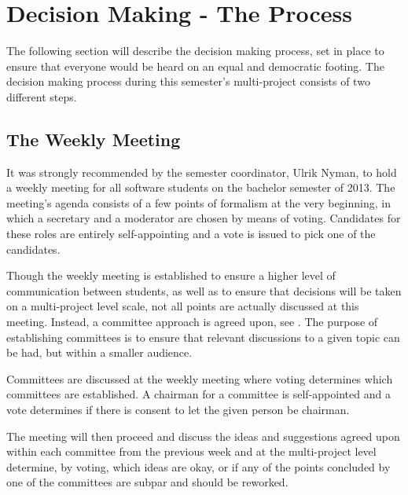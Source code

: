 \section{Decision Making - The Process}
\label{sec:decisionmaking}

The following section will describe the decision making process, set in place to ensure that everyone would be heard on an equal and democratic footing. The decision making process during this semester's multi-project consists of two different steps.

\subsection{The Weekly Meeting}
\label{sub:theweeklymeeting}

It was strongly recommended by the semester coordinator, Ulrik Nyman, to hold a weekly meeting for all software students on the bachelor semester of 2013. The meeting's agenda consists of a few points of formalism at the very beginning, in which a secretary and a moderator are chosen by means of voting. Candidates for these roles are entirely self-appointing and a vote is issued to pick one of the candidates. %

Though the weekly meeting is established to ensure a higher level of communication between students, as well as to ensure that decisions will be taken on a multi-project level scale, not all points are actually discussed at this meeting. Instead, a committee approach is agreed upon, see . The purpose of establishing committees is to ensure that relevant discussions to a given topic can be had, but within a smaller audience.

Committees are discussed at the weekly meeting where voting determines which committees are established. A chairman for a committee is self-appointed and a vote determines if there is consent to let the given person be chairman.

The meeting will then proceed and discuss the ideas and suggestions agreed upon within each committee from the previous week and at the multi-project level determine, by voting, which ideas are okay, or if any of the points concluded by one of the committees are subpar and should be reworked.


